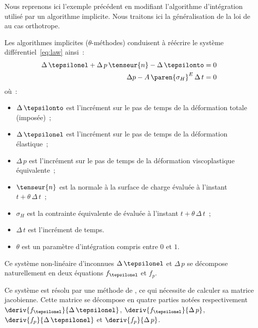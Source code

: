 \documentclass[rectoverso,pleiades,pstricks,leqno,anti]{texmf/note_technique_2010}
\newcommand{\sigmaH}{\ensuremath{\sigma_{H}}}
\begin{document}
Nous reprenons ici l'exemple précédent en modifiant l'algorithme
d'intégration utilisé par un algorithme implicite. Nous traitons ici la
généralisation de la loi de  au cas orthotrope.

Les algorithmes implicites (\(\theta\)-méthodes) conduisent à réécrire
le système différentiel~\eqref{eq:law} ainsi~:
\begin{equation}
  \begin{aligned}
    \Delta\,\tepsilonel + \Delta\,p\,\tenseur{n} - \Delta\,\tepsilonto &= 0 \\
    \Delta{p}   - A\,\paren{\sigmaH}^{E}\,\Delta\, t &= 0 \\
  \end{aligned}
\end{equation}
où~:
\begin{minipage}[t]{0.8\linewidth}
  \begin{itemize}
  \item \(\Delta\,\tepsilonto\) est l'incrément sur le pas de temps de
    la déformation totale (imposée)~;
  \item \(\Delta\,\tepsilonel\) est l'incrément sur le pas de temps de
    la déformation élastique~;
  \item \(\Delta\,p\) est l'incrément sur le pas de temps de la
    déformation viscoplastique équivalente~;
  \item \(\tenseur{n}\) est la normale à la surface de charge évaluée
    à l'instant \(t+\theta\,\Delta\,t\)~;
  \item \(\sigmaH\) est la contrainte équivalente de 
    évaluée à l'instant \(t+\theta\,\Delta\,t\)~;
  \item \(\Delta\,t\) est l'incrément de temps.
  \item \(\theta\) est un paramètre d'intégration compris entre \(0\)
    et \(1\).
  \end{itemize}
\end{minipage}

Ce système non-linéaire d'inconnues \(\Delta\,\tepsilonel\) et
\(\Delta\,p\) se décompose naturellement en deux équations
\(f_{\tepsilonel}\) et \(f_{p}\).

Ce système est résolu par une méthode de , ce qui
nécessite de calculer sa matrice jacobienne. Cette matrice se décompose
en quatre parties notées respectivement
\(\deriv{f_{\tepsilonel}}{\Delta\,\tepsilonel}\),
\(\deriv{f_{\tepsilonel}}{\Delta\,p}\),
\(\deriv{f_{p}}{\Delta\,\tepsilonel}\) et \(\deriv{f_{p}}{\Delta\,p}\).
\end{document}
